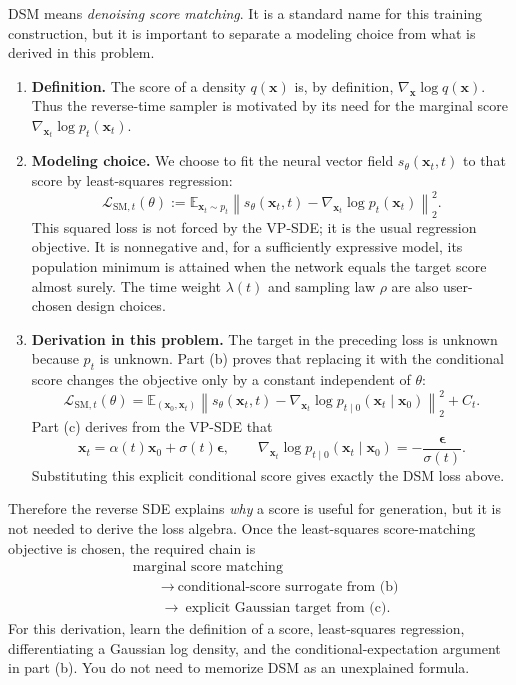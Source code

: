 \documentclass[11pt,a4paper]{article}
\theoremstyle{definition}
\begin{document}
\begin{note}
DSM means \emph{denoising score matching}. It is a standard name for this training
construction, but it is important to separate a modeling choice from what is derived in
this problem.

\begin{enumerate}
    \item \textbf{Definition.} The score of a density $q(\mathbf{x})$ is, by definition,
    $\nabla_{\mathbf{x}}\log q(\mathbf{x})$. Thus the reverse-time sampler is motivated by
    its need for the marginal score $\nabla_{\mathbf{x}_t}\log p_t(\mathbf{x}_t)$.

    \item \textbf{Modeling choice.} We choose to fit the neural vector field
    $s_\theta(\mathbf{x}_t,t)$ to that score by least-squares regression:
    \[
    \mathcal{L}_{\mathrm{SM},t}(\theta)
    :=
    \mathbb{E}_{\mathbf{x}_t\sim p_t}
    \left\|
    s_\theta(\mathbf{x}_t,t)
    -\nabla_{\mathbf{x}_t}\log p_t(\mathbf{x}_t)
    \right\|_2^2.
    \]
    This squared loss is not forced by the VP-SDE; it is the usual regression objective.
    It is nonnegative and, for a sufficiently expressive model, its population minimum is
    attained when the network equals the target score almost surely. The time weight
    $\lambda(t)$ and sampling law $\rho$ are also user-chosen design choices.

    \item \textbf{Derivation in this problem.} The target in the preceding loss is unknown
    because $p_t$ is unknown. Part (b) proves that replacing it with the conditional score
    changes the objective only by a constant independent of $\theta$:
    \[
    \mathcal{L}_{\mathrm{SM},t}(\theta)
    =
    \mathbb{E}_{(\mathbf{x}_0,\mathbf{x}_t)}
    \left\|
    s_\theta(\mathbf{x}_t,t)
    -\nabla_{\mathbf{x}_t}
    \log p_{t\mid0}(\mathbf{x}_t\mid\mathbf{x}_0)
    \right\|_2^2
    +C_t.
    \]
    Part (c) derives from the VP-SDE that
    \[
    \mathbf{x}_t
    =\alpha(t)\mathbf{x}_0+\sigma(t)\boldsymbol{\epsilon},
    \qquad
    \nabla_{\mathbf{x}_t}\log
    p_{t\mid0}(\mathbf{x}_t\mid\mathbf{x}_0)
    =-\frac{\boldsymbol{\epsilon}}{\sigma(t)}.
    \]
    Substituting this explicit conditional score gives exactly the DSM loss above.
\end{enumerate}

Therefore the reverse SDE explains \emph{why} a score is useful for generation, but it is
not needed to derive the loss algebra. Once the least-squares score-matching objective is
chosen, the required chain is
\[
\begin{aligned}
&\text{marginal score matching}\\
&\qquad\longrightarrow\ \text{conditional-score surrogate from (b)}\\
&\qquad\longrightarrow\ \text{explicit Gaussian target from (c)}.
\end{aligned}
\]
For this derivation, learn the definition of a score, least-squares regression,
differentiating a Gaussian log density, and the conditional-expectation argument in part
(b). You do not need to memorize DSM as an unexplained formula.
\end{note}
\end{document}
